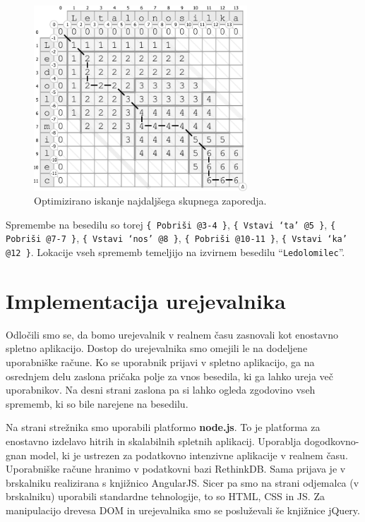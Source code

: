 \documentclass[a4paper, 12pt, twoside]{book}
\begin{document}
\begin{figure}[placement h]
\begin{center}
\includegraphics[width=8cm]{img/ses9.pdf}
\end{center}
\caption{Optimizirano iskanje najdaljšega skupnega zaporedja.}
\label{ses9}
\end{figure}

Spremembe na besedilu so torej {\tt \{ Pobriši @3-4 \}}, {\tt \{ Vstavi ‘ta’ @5 \}}, {\tt \{ Pobriši @7-7 \}}, {\tt \{ Vstavi ‘nos’ @8 \}}, {\tt \{ Pobriši @10-11 \}}, {\tt \{ Vstavi ‘ka’ @12 \}}. Lokacije vseh sprememb temeljijo na izvirnem besedilu “{\tt Ledolomilec}”.

\chapter{Implementacija urejevalnika}

Odločili smo se, da bomo urejevalnik v realnem času zasnovali kot enostavno spletno aplikacijo. Dostop do urejevalnika smo omejili le na dodeljene uporabniške račune. Ko se uporabnik prijavi v spletno aplikacijo, ga na osrednjem delu zaslona pričaka polje za vnos besedila, ki ga lahko ureja več uporabnikov. Na desni strani zaslona pa si lahko ogleda zgodovino vseh sprememb, ki so bile narejene na besedilu.

Na strani strežnika smo uporabili platformo \textbf{node.js}. To je platforma za enostavno izdelavo hitrih in skalabilnih spletnih aplikacij. Uporablja dogodkovno-gnan model, ki je ustrezen za podatkovno intenzivne aplikacije v realnem času. Uporabniške račune hranimo v podatkovni bazi RethinkDB. Sama prijava je v brskalniku realizirana s knjižnico AngularJS. Sicer pa smo na strani odjemalca (v brskalniku) uporabili standardne tehnologije, to so HTML, CSS in JS. Za manipulacijo drevesa DOM in urejevalnika smo se posluževali še knjižnice jQuery.
\end{document}

